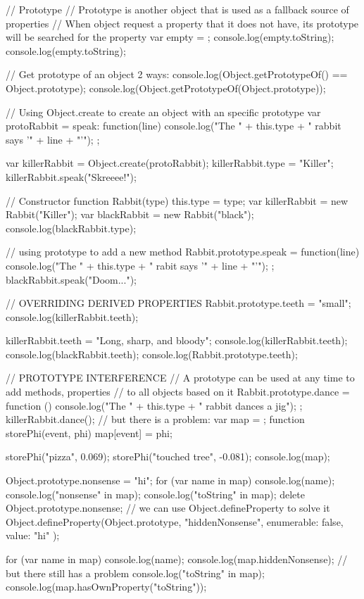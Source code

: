 // Prototype
// Prototype is another object that is used as a fallback source of properties
// When object request a property that it does not have, its prototype will be searched for the property
var empty = {};
console.log(empty.toString);
console.log(empty.toString);

// Get prototype of an object 2 ways:
console.log(Object.getPrototypeOf({}) == Object.prototype);
console.log(Object.getPrototypeOf(Object.prototype));

// Using Object.create to create an object with an specific prototype
var protoRabbit = {
  speak: function(line){
    console.log("The " + this.type + " rabbit says '" + line + "'");
  }
};

var killerRabbit = Object.create(protoRabbit);
killerRabbit.type = "Killer";
killerRabbit.speak("Skreeee!");

// Constructor
function Rabbit(type){
   this.type = type;
}
var killerRabbit = new Rabbit("Killer");
var blackRabbit = new Rabbit("black");
console.log(blackRabbit.type);

// using prototype to add a new method
Rabbit.prototype.speak = function(line) {
  console.log("The " + this.type + " rabit says '" + line + "'");
};
blackRabbit.speak("Doom...");


// OVERRIDING DERIVED PROPERTIES
Rabbit.prototype.teeth = "small";
console.log(killerRabbit.teeth);

killerRabbit.teeth = "Long, sharp, and bloody";
console.log(killerRabbit.teeth);
console.log(blackRabbit.teeth);
console.log(Rabbit.prototype.teeth);

// PROTOTYPE INTERFERENCE
// A prototype can be used at any time to add methods, properties
// to all objects based on it
Rabbit.prototype.dance = function (){
  console.log("The " + this.type + " rabbit dances a jig");
};
killerRabbit.dance();
// but there is a problem:
var map = {};
function storePhi(event, phi){
   map[event] = phi;
}

storePhi("pizza", 0.069);
storePhi("touched tree", -0.081);
console.log(map);

Object.prototype.nonsense = "hi";
for (var name in map) {
  console.log(name);
}
console.log("nonsense" in map);
console.log("toString" in map);
delete Object.prototype.nonsense;
//  we can use Object.defineProperty to solve it
Object.defineProperty(Object.prototype, "hiddenNonsense", {
   enumerable: false,
   value: "hi"
});

for (var name in map) {
  console.log(name);
}
console.log(map.hiddenNonsense);
// but there still has a problem
console.log("toString" in map);
console.log(map.hasOwnProperty("toString"));

